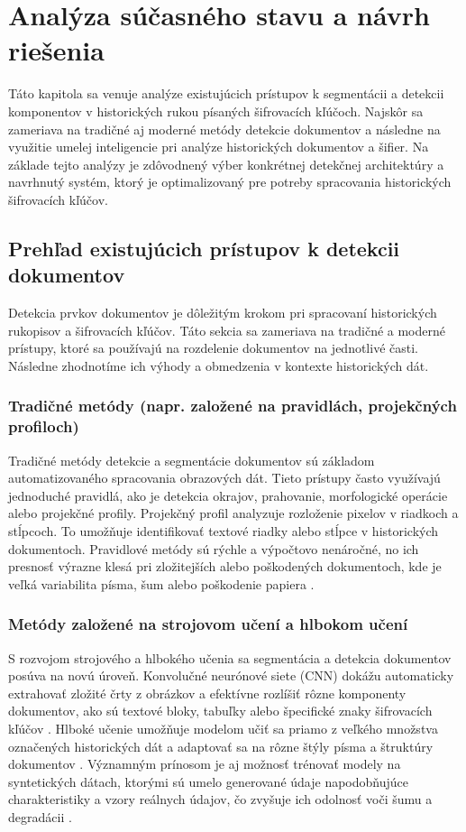 \section{Analýza súčasného stavu a návrh riešenia}
Táto kapitola sa venuje analýze existujúcich prístupov k segmentácii a detekcii komponentov v historických rukou písaných šifrovacích kľúčoch. Najskôr sa zameriava na tradičné aj moderné metódy detekcie dokumentov a následne na využitie umelej inteligencie pri analýze historických dokumentov a šifier. Na základe tejto analýzy je zdôvodnený výber konkrétnej detekčnej architektúry a navrhnutý systém, ktorý je optimalizovaný pre potreby spracovania historických šifrovacích kľúčov.

    \subsection{Prehľad existujúcich prístupov k detekcii dokumentov}
    Detekcia prvkov dokumentov je dôležitým krokom pri spracovaní historických rukopisov a šifrovacích kľúčov. Táto sekcia sa zameriava na tradičné a moderné prístupy, ktoré sa používajú na rozdelenie dokumentov na jednotlivé časti. Následne zhodnotíme ich výhody a obmedzenia v kontexte historických dát.
    
        \subsubsection{Tradičné metódy (napr. založené na pravidlách, projekčných profiloch)}
        Tradičné metódy detekcie a segmentácie dokumentov sú základom automatizovaného spracovania obrazových dát. Tieto prístupy často využívajú jednoduché pravidlá, ako je detekcia okrajov, prahovanie, morfologické operácie alebo projekčné profily. Projekčný profil analyzuje rozloženie pixelov v riadkoch a stĺpcoch. To umožňuje identifikovať textové riadky alebo stĺpce v historických dokumentoch. Pravidlové metódy sú rýchle a výpočtovo nenáročné, no ich presnosť výrazne klesá pri zložitejších alebo poškodených dokumentoch, kde je veľká variabilita písma, šum alebo poškodenie papiera \cite{likforman2017text, casey1996survey}.
        \subsubsection{Metódy založené na strojovom učení a hlbokom učení}
        S rozvojom strojového a hlbokého učenia sa segmentácia a detekcia dokumentov posúva na novú úroveň. Konvolučné neurónové siete (CNN) dokážu automaticky extrahovať zložité črty z obrázkov a efektívne rozlíšiť rôzne komponenty dokumentov, ako sú textové bloky, tabuľky alebo špecifické znaky šifrovacích kľúčov \cite{oliveira2018dhsegment, xu2020layoutlm}. Hlboké učenie umožňuje modelom učiť sa priamo z veľkého množstva označených historických dát a adaptovať sa na rôzne štýly písma a štruktúry dokumentov \cite{simistira2017icdar, zhai2019deep}. Významným prínosom je aj možnosť trénovať modely na syntetických dátach, ktorými sú umelo generované údaje napodobňujúce charakteristiky a vzory reálnych údajov, čo zvyšuje ich odolnosť voči šumu a degradácii \cite{wigington2018start}.
